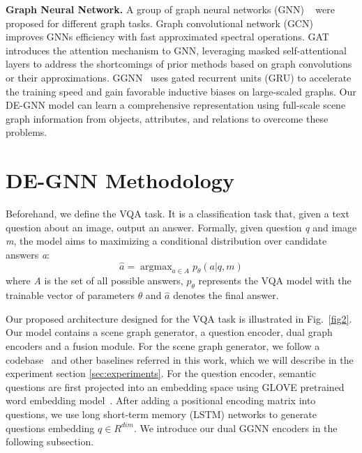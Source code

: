 \documentclass[letterpaper]{article} %
\begin{document}
\vspace{0.05in}
\noindent\textbf{Graph Neural Network.}
A group of graph neural networks (GNN) ~\cite{DBLP:journals/tnn/ScarselliGTHM09,DBLP:conf/cncl/WangGCL16,DBLP:conf/aaai/WangCGL18,DBLP:conf/aistats/SunL19,DBLP:conf/aaai/0001RFHLRG19,DBLP:conf/aaai/LiuCLZLSQ19} were proposed for different graph tasks.
Graph convolutional network (GCN)~\cite{DBLP:conf/iclr/KipfW17} improves GNNs efficiency with fast approximated spectral operations. 
GAT~\cite{DBLP:conf/iclr/VelickovicCCRLB18} introduces the attention mechanism to GNN, leveraging masked self-attentional layers to address the shortcomings of prior methods based on graph convolutions or their approximations. GGNN~\cite{DBLP:journals/corr/LiTBZ15} uses gated recurrent units (GRU) to accelerate the training speed and gain favorable inductive biases on large-scaled graphs.
Our DE-GNN model can learn a comprehensive representation using full-scale scene graph information from objects, attributes, and relations to overcome these problems.


\section{DE-GNN Methodology}

Beforehand, we define the VQA task. 
It is a classification task that, given a text question about an image, output an answer. 
Formally, given question \emph{q} and image \emph{m}, the model aims to maximizing a conditional distribution over candidate answers \emph{a}:
\begin{equation}
    \hat{a} = \mathop{\arg\max}_{a \in A}p_\theta(a|q, m)
\end{equation}
where \emph{A} is the set of all possible answers, $p_\theta$ represents the VQA model with the trainable vector of parameters $\theta$ and $\hat{a}$ denotes the final answer.

Our proposed architecture designed for the VQA task is illustrated in Fig.~\ref{fig2}. 
Our model contains a scene graph generator, a question encoder, dual graph encoders and a fusion module. For the scene graph generator, we follow a codebase~\cite{tang2020sggcode} and other baselines referred in this work, which we will describe in the experiment section \ref{sec:experiments}. 
For the question encoder, semantic questions are first projected into an embedding space using GLOVE pretrained word embedding model~\cite{pennington-etal-2014-glove}. 
After adding a positional encoding matrix into questions, we use long short-term memory (LSTM) networks to generate questions embedding $q \in R^{dim}$. 
We introduce our dual GGNN encoders in the following subsection.
\end{document}
